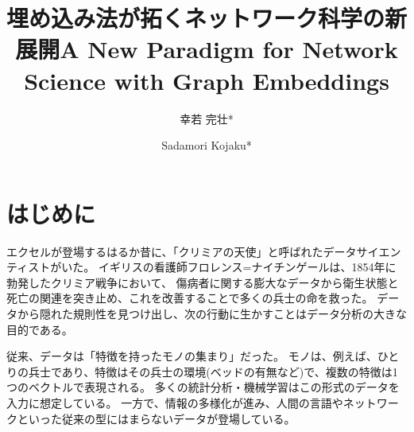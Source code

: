 \documentclass[12pt]{jarticle}
\begin{document}
\title{埋め込み法が拓くネットワーク科学の新展開}
\author{幸若 完壮*}

\title{A New Paradigm for Network Science with Graph Embeddings}
\author{Sadamori {\sc Kojaku}*}

\maketitle




\section{はじめに}
\label{sec:introduction}


エクセルが登場するはるか昔に、「クリミアの天使」と呼ばれたデータサイエンティストがいた。
イギリスの看護師フロレンス=ナイチンゲールは、1854年に勃発したクリミア戦争において、
傷病者に関する膨大なデータから衛生状態と死亡の関連を突き止め、これを改善することで多くの兵士の命を救った。
データから隠れた規則性を見つけ出し、次の行動に生かすことはデータ分析の大きな目的である。

従来、データは「特徴を持ったモノの集まり」だった。
モノは、例えば、ひとりの兵士であり、特徴はその兵士の環境(ベッドの有無など)で、複数の特徴は1つのベクトルで表現される。
多くの統計分析・機械学習はこの形式のデータを入力に想定している。
一方で、情報の多様化が進み、人間の言語やネットワークといった従来の型にはまらないデータが登場している。
\end{document}
